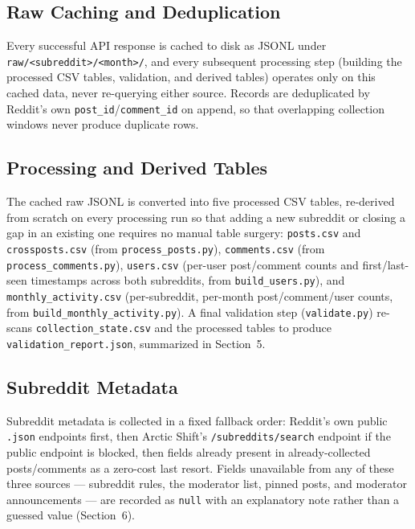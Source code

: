 \documentclass[12pt]{article}
\begin{document}
\subsection{Raw Caching and Deduplication}
Every successful API response is cached to disk as JSONL under \texttt{raw/<subreddit>/<month>/},
and every subsequent processing step (building the processed CSV tables, validation, and
derived tables) operates only on this cached data, never re-querying either source. Records are
deduplicated by Reddit's own \texttt{post\_id}/\texttt{comment\_id} on append, so that overlapping
collection windows never produce duplicate rows.

\subsection{Processing and Derived Tables}
The cached raw JSONL is converted into five processed CSV tables, re-derived from scratch on
every processing run so that adding a new subreddit or closing a gap in an existing one requires
no manual table surgery: \texttt{posts.csv} and \texttt{crossposts.csv} (from
\texttt{process\_posts.py}), \texttt{comments.csv} (from \texttt{process\_comments.py}),
\texttt{users.csv} (per-user post/comment counts and first/last-seen timestamps across both
subreddits, from \texttt{build\_users.py}), and \texttt{monthly\_activity.csv} (per-subreddit,
per-month post/comment/user counts, from \texttt{build\_monthly\_activity.py}). A final
validation step (\texttt{validate.py}) re-scans \texttt{collection\_state.csv} and the processed
tables to produce \texttt{validation\_report.json}, summarized in Section~5.

\subsection{Subreddit Metadata}
Subreddit metadata is collected in a fixed fallback order: Reddit's own public \texttt{.json}
endpoints first, then Arctic Shift's \texttt{/subreddits/search} endpoint if the public endpoint
is blocked, then fields already present in already-collected posts/comments as a zero-cost last
resort. Fields unavailable from any of these three sources — subreddit rules, the moderator list,
pinned posts, and moderator announcements — are recorded as \texttt{null} with an explanatory
note rather than a guessed value (Section~6).


\end{document}

